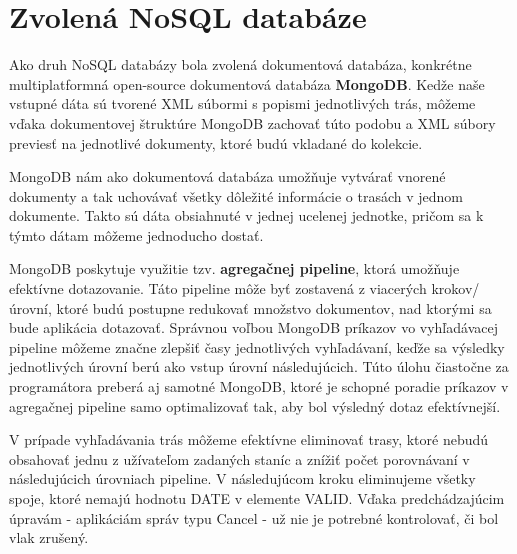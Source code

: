 \documentclass[10pt,xcolor=pdflatex,dvipsnames,table,oneside]{book}
\begin{document}
\chapter{Zvolená NoSQL databáze}
\par Ako druh NoSQL databázy bola zvolená dokumentová databáza, konkrétne multiplatformná open-source dokumentová databáza \textbf{MongoDB}. Kedže naše vstupné dáta sú tvorené XML súbormi s popismi jednotlivých trás, môžeme vďaka dokumentovej štruktúre MongoDB zachovať túto podobu a XML súbory previesť na jednotlivé dokumenty, ktoré budú vkladané do kolekcie. 
\par MongoDB nám ako dokumentová databáza umožňuje vytvárať vnorené dokumenty a tak uchovávať všetky dôležité informácie o trasách v jednom dokumente. Takto sú dáta obsiahnuté v jednej ucelenej jednotke, pričom sa k týmto dátam môžeme jednoducho dostať.
\par MongoDB poskytuje využitie tzv. \textbf{agregačnej pipeline}, ktorá umožňuje efektívne dotazovanie. Táto pipeline môže byť zostavená z viacerých krokov/úrovní, ktoré budú postupne redukovať množstvo dokumentov, nad ktorými sa bude aplikácia dotazovať. Správnou voľbou MongoDB príkazov vo vyhľadávacej pipeline môžeme značne zlepšiť časy jednotlivých vyhľadávaní, keďže sa výsledky jednotlivých úrovní berú ako vstup úrovní následujúcich. Túto úlohu čiastočne za programátora preberá aj samotné MongoDB, ktoré je schopné poradie príkazov v agregačnej pipeline samo optimalizovať tak, aby bol výsledný dotaz efektívnejší.
\par V prípade vyhľadávania trás môžeme efektívne eliminovať trasy, ktoré nebudú obsahovať jednu z užívateľom zadaných staníc a znížiť počet porovnávaní v následujúcich úrovniach pipeline.
V následujúcom kroku eliminujeme všetky spoje, ktoré nemajú hodnotu DATE v elemente VALID. Vďaka predchádzajúcim úpravám - aplikáciám správ typu Cancel - už nie je potrebné kontrolovať, či bol vlak zrušený.

\end{document}
